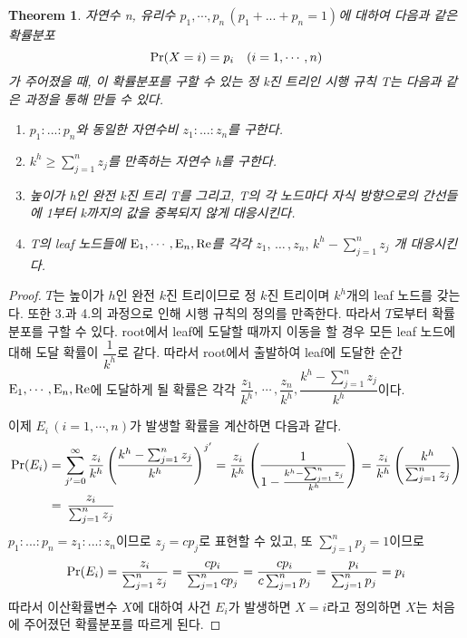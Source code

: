 \documentclass[11pt]{article}
\newtheorem{theorem}{Theorem}
\begin{document}
\singlespacing
\begin{theorem}
자연수 n, 유리수 $p_{1}, \cdots, p_{n}\,(p_{1}+...+p_{n}=1)$에 대하여 다음과 같은 확률분포
\[\textnormal{Pr}(X = i) = p_{i} \quad(i = 1,\cdots, n)\]
가 주어졌을 때, 이 확률분포를 구할 수 있는 정 k진 트리인 시행 규칙 T는 다음과 같은 과정을 통해 만들 수 있다.
\begin{enumerate}
    \item $p_{1}:...:p_{n}$와 동일한 자연수비 $z_{1}:...:z_{n}$를 구한다.
    \item $k^{h} \ge \displaystyle \sum_{j=1}^{n} z_{j}$를 만족하는 자연수 h를 구한다.
    \item 높이가 h인 완전 k진 트리 T를 그리고, T의 각 노드마다 자식 방향으로의 간선들에 1부터 k까지의 값을 중복되지 않게 대응시킨다.
    \item T의 leaf 노드들에 $\textnormal{E}_1,\cdots,\textnormal{E}_n,\textnormal{Re}$를 각각 $z_{1},\,\dots\,,z_{n},\,k^{h}-\displaystyle \sum_{j=1}^{n}z_{j}$ 개 대응시킨다.
\end{enumerate}
\label{thm02}
\end{theorem}
\doublespacing

\begin{proof}
$T$는 높이가 $h$인 완전 $k$진 트리이므로 정 $k$진 트리이며 $k^{h}$개의 leaf 노드를 갖는다. 또한 3.과 4.의 과정으로 인해 시행 규칙의 정의를 만족한다. 따라서 $T$로부터 확률분포를 구할 수 있다. root에서 leaf에 도달할 때까지 이동을 할 경우 모든 leaf 노드에 대해 도달 확률이 $\dfrac{1}{k^{h}}$로 같다. 따라서 root에서 출발하여 leaf에 도달한 순간 $\textnormal{E}_1,\cdots,\textnormal{E}_n,\textnormal{Re}$에 도달하게 될 확률은 각각 $\dfrac{z_{1}}{k^{h}},\,\cdots\,,\dfrac{z_{n}}{k^{h}},\dfrac{k^{h}-\sum_{j=1}^{n}z_{j}}{k^{h}}$이다.

이제 $E_{i}\,(i=1,\cdots,n)$가 발생할 확률을 계산하면 다음과 같다.
\[
\begin{split}
\textnormal{Pr}(E_{i}) & = \sum_{j'=0}^{\infty} \frac{z_{i}}{k^{h}}\left(\frac{k^{h}-\sum_{j=1}^{n}z_{j}}{k^{h}}\right)^{j'} = \frac{z_{i}}{k^{h}}\left(\frac{1}{1 - \frac{k^{h}-\sum_{j=1}^{n}z_{j}}{k^{h}}}\right) = \frac{z_{i}}{k^{h}}\left(\frac{k^{h}}{\sum_{j=1}^{n}z_{j}}\right)\\
& = \,\frac{z_{i}}{\sum_{j=1}^{n}z_{j}}
\end{split}
\]
$p_{1}:...:p_{n} = z_{1}:...:z_{n}$이므로 $z_{j} = cp_{j}$로 표현할 수 있고, 또 $\sum_{j=1}^{n}p_{j} = 1$이므로
\[\textnormal{Pr}(E_{i}) = \frac{z_{i}}{\sum_{j=1}^{n}z_{j}} = \frac{cp_{i}}{\sum_{j=1}^{n}cp_{j}} = \frac{cp_{i}}{c\sum_{j=1}^{n}p_{j}} = \frac{p_{i}}{\sum_{j=1}^{n}p_{j}} = p_{i}\]
따라서 이산확률변수 $X$에 대하여 사건 $E_{i}$가 발생하면 $X = i$라고 정의하면 $X$는 처음에 주어졌던 확률분포를 따르게 된다.
\end{proof}
\end{document}
